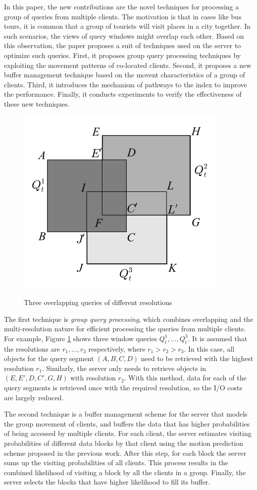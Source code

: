 \documentclass[paper=a4, fontsize=18pt]{article} %
\numberwithin{equation}{section} %
\numberwithin{figure}{section} %
\numberwithin{table}{section} %
\begin{document}
In this paper, the new contributions are the novel techniques for processing a group of queries from multiple clients. The motivation is that in cases like bus tours, it is common that a group of tourists will visit places in a city together. In such scenarios, the views of query windows might overlap each other. Based on this observation, the paper proposes a suit of techniques used on the server to optimize such queries. First, it proposes group query processing techniques by exploiting the movement patterns of co-located clients. Second, it proposes a new buffer management technique based on the movent characteristics of a group of clients. Third, it introduces the mechanism of pathways to the index to improve the performance. Finally, it conducts experiments to verify the effectiveness of these new techniques.

\begin{figure}[h]
  \centering
  \includegraphics[width=.5\linewidth]{8_29_3D_query.png}\\
  \caption{Three overlapping queries of different resolutions}\label{fig:3D_query}
\end{figure}

The first technique is \emph{group query processing}, which combines overlapping and the multi-resolution nature for efficient processing the queries from multiple clients. For example, Figure \ref{fig:3D_query} shows three window queries $Q_t^1,..., Q_t^3$. It is assumed that the resolutions are $r_1,...,r_3$ respectively, where $r_1 > r_2 > r_3$. In this case, all objects for the query segment $(A,B,C,D)$ need to be retrieved with the highest resolution $r_1$. Similarly, the server only needs to retrieve objects in $(E,E',D,C',G,H)$ with resolution $r_2$. With this method, data for each of the query segments is retrieved once with the required resolution, so the I/O costs are largely reduced.

The second technique is a buffer management scheme for the server that models the group movement of clients, and buffers the data that has higher probabilities of being accessed by multiple clients. For each client, the server estimates visiting probabilities of different data blocks by that client using the motion prediction scheme proposed in the previous work. After this step, for each block the server sums up the visiting probabilities of all clients. This process results in the combined likelihood of visiting a block by all the clients in a group. Finally, the server selects the blocks that have higher likelihood to fill its buffer.
\end{document}
